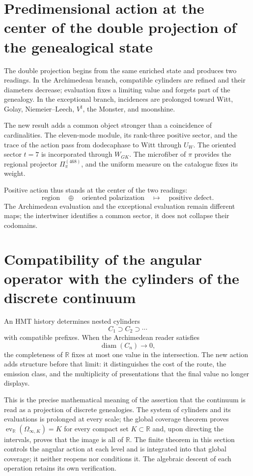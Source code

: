 \section{Predimensional action at the center of the double projection of the genealogical state}

The double projection begins from the same enriched state and produces two readings. In the Archimedean branch, compatible cylinders are refined and their diameters decrease; evaluation fixes a limiting value and forgets part of the genealogy. In the exceptional branch, incidences are prolonged toward Witt, Golay, Niemeier--Leech, \(V^\natural\), the Monster, and moonshine.

The new result adds a common object stronger than a coincidence of cardinalities. The eleven-mode module, its rank-three positive sector, and the trace of the action pass from dodecaphase to Witt through \(U_W\). The oriented sector \(t=7\) is incorporated through \(W_{GK}\). The microfiber of \(\pi\) provides the regional projector \(\Pi_\pi^{(468)}\), and the uniform measure on the catalogue fixes its weight.

Positive action thus stands at the center of the two readings:
\[
 \text{region}
 \quad\oplus\quad
 \text{oriented polarization}
 \quad\longmapsto\quad
 \text{positive defect}.
\]
The Archimedean evaluation and the exceptional evaluation remain
different maps; the intertwiner identifies a common sector, it does not
collapse their codomains.

\section{Compatibility of the angular operator with the cylinders of the discrete continuum}

An HMT history determines nested cylinders
\[
 C_1\supset C_2\supset\cdots
\]
with compatible prefixes. When the Archimedean reader satisfies
\[
 \operatorname{diam}(C_n)\longrightarrow0,
\]
the completeness of \(\mathbb R\) fixes at most one value in the intersection.
The new action adds structure before that limit: it distinguishes the cost
of the route, the emission class, and the multiplicity of presentations that the
final value no longer displays.

This is the precise mathematical meaning of the assertion that the continuum is read as a
projection of discrete genealogies. The system of cylinders and its
evaluations is prolonged at every scale; the global coverage theorem proves
\(\operatorname{ev}_{\mathbb R}(\Omega_{\infty,K})=K\) for every compact set
\(K\subset\mathbb R\) and, upon directing the intervals, proves that the image is all of
\(\mathbb R\). The finite theorem in this section controls the angular action
at each level and is integrated into that global coverage; it neither reopens nor
conditions it. The algebraic descent of each operation retains its own
verification.

